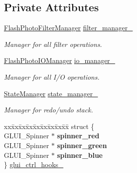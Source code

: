 \subsection*{Private Attributes}
\begin{DoxyCompactItemize}
\item 
\hyperlink{classimage__tools_1_1FlashPhotoFilterManager}{Flash\+Photo\+Filter\+Manager} \hyperlink{classimage__tools_1_1FlashPhotoApp_a3f8dbc31a17258c6d2281db812bcc9a5}{filter\+\_\+manager\+\_\+}\hypertarget{classimage__tools_1_1FlashPhotoApp_a3f8dbc31a17258c6d2281db812bcc9a5}{}\label{classimage__tools_1_1FlashPhotoApp_a3f8dbc31a17258c6d2281db812bcc9a5}

\begin{DoxyCompactList}\small\item\em Manager for all filter operations. \end{DoxyCompactList}\item 
\hyperlink{classimage__tools_1_1FlashPhotoIOManager}{Flash\+Photo\+I\+O\+Manager} \hyperlink{classimage__tools_1_1FlashPhotoApp_a5ab6a309fa8857b9a8d15f4bf7cff803}{io\+\_\+manager\+\_\+}\hypertarget{classimage__tools_1_1FlashPhotoApp_a5ab6a309fa8857b9a8d15f4bf7cff803}{}\label{classimage__tools_1_1FlashPhotoApp_a5ab6a309fa8857b9a8d15f4bf7cff803}

\begin{DoxyCompactList}\small\item\em Manager for all I/O operations. \end{DoxyCompactList}\item 
\hyperlink{classimage__tools_1_1StateManager}{State\+Manager} \hyperlink{classimage__tools_1_1FlashPhotoApp_a0331ca8ddc87630ce3820448fe3f0840}{state\+\_\+manager\+\_\+}\hypertarget{classimage__tools_1_1FlashPhotoApp_a0331ca8ddc87630ce3820448fe3f0840}{}\label{classimage__tools_1_1FlashPhotoApp_a0331ca8ddc87630ce3820448fe3f0840}

\begin{DoxyCompactList}\small\item\em Manager for redo/undo stack. \end{DoxyCompactList}\item 
\begin{tabbing}
xx\=xx\=xx\=xx\=xx\=xx\=xx\=xx\=xx\=\kill
struct \{\\
\>GLUI\_Spinner $\ast$ {\bfseries spinner\_red}\\
\>GLUI\_Spinner $\ast$ {\bfseries spinner\_green}\\
\>GLUI\_Spinner $\ast$ {\bfseries spinner\_blue}\\
\} \hyperlink{classimage__tools_1_1FlashPhotoApp_a006595306904df2bdb384fa7f57f8c44}{glui\_ctrl\_hooks\_}\hypertarget{classimage__tools_1_1FlashPhotoApp_a006595306904df2bdb384fa7f57f8c44}{}\label{classimage__tools_1_1FlashPhotoApp_a006595306904df2bdb384fa7f57f8c44}
\\


\end{tabbing}
\end{DoxyCompactItemize}
